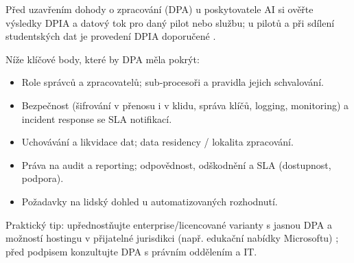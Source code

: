 \noindent Před uzavřením dohody o zpracování (DPA) u poskytovatele AI si ověřte výsledky DPIA a datový tok pro daný pilot nebo službu; u pilotů a při sdílení studentských dat je provedení DPIA doporučené \cite{kb_ai_101_tipu_pdf_04e4a115_page_8_1}.

Níže klíčové body, které by DPA měla pokrýt:

\begin{itemize}
  \item Role správců a zpracovatelů; sub‑procesoři a pravidla jejich schvalování.
  \item Bezpečnost (šifrování v přenosu i v klidu, správa klíčů, logging, monitoring) a incident response se SLA notifikací.
  \item Uchovávání a likvidace dat; data residency / lokalita zpracování.
  \item Práva na audit a reporting; odpovědnost, odškodnění a SLA (dostupnost, podpora).
  \item Požadavky na lidský dohled u automatizovaných rozhodnutí.
\end{itemize}

Praktický tip: upřednostňujte enterprise/licencované varianty s jasnou DPA a možností hostingu v přijatelné jurisdikci (např. edukační nabídky Microsoftu) \cite{kb_ai_101_tipu_pdf_04e4a115_page_3_1}; před podpisem konzultujte DPA s právním oddělením a IT.